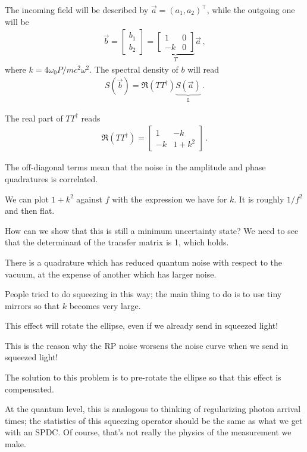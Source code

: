 \documentclass[main.tex]{subfiles}
\begin{document}
The incoming field will be described by \(\vec{a} = (a_1, a_2 )^{\top}\), while the 
outgoing one will be 
%
\begin{align}
\vec{b} = \left[\begin{array}{c}
b_1  \\ 
b_2 
\end{array}\right]
= \underbrace{\left[\begin{array}{cc}
1 & 0 \\ 
-k & 0
\end{array}\right] }_{T}
\vec{a}
\,,
\end{align}
%
where \(k = 4 \omega_0 P / mc^2 \omega^2\). 
The spectral density of \(b\) will read 
%
\begin{align}
S(\vec{b}) = \Re (T T ^\dag) \underbrace{S(\vec{a})}_{\mathbb{1}}
\,.
\end{align}

The real part of \(T T ^\dag\) reads 
%
\begin{align}
\Re (T T ^\dag) = \left[\begin{array}{cc}
1 & -k \\ 
-k & 1+k^2
\end{array}\right]
\,.
\end{align}

The off-diagonal terms mean that the noise in the amplitude and phase quadratures
is correlated. 

We can plot \(1 + k^2\) against \(f\) with the expression we have for \(k\). 
It is roughly \(1 / f^2\) and then flat.

How can we show that this is still a minimum uncertainty state? We need to
see that the determinant of the transfer matrix is 1, which holds. 

There is a quadrature which has reduced quantum noise with respect to the vacuum, 
at the expense of another which has larger noise. 

People tried to do squeezing in this way; the main thing to do is to use 
tiny mirrors so that \(k\) becomes very large. 

This effect will rotate the ellipse, even if we already send in squeezed light!

This is the reason why the RP noise worsens the noise curve when we send in squeezed light! 

The solution to this problem is to pre-rotate the ellipse so that this effect is 
compensated. 

At the quantum level, this is analogous to thinking of regularizing photon arrival times; 
the statistics of this squeezing operator should be the same as what we get with an SPDC. 
Of course, that's not really the physics of the measurement we make. 
\end{document}
